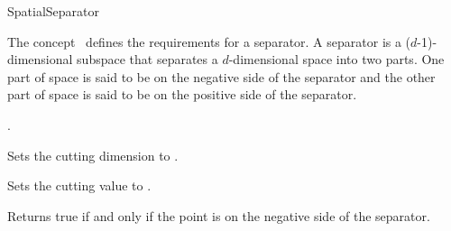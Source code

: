 

\begin{ccRefConcept}{SpatialSeparator}

\begin{ccAdvanced}


\ccDefinition
  
The concept \ccRefName\ defines the requirements for a separator.
A separator is a ($d$-1)-dimensional subspace that separates a $d$-dimensional space into two parts.
One part of space is said to be on the negative side of the separator and the other part of space is 
said to be on the positive side of the separator.

\ccHasModels

.

\ccTypes


\ccCreation
{}  %


\ccOperations

{Sets the cutting dimension to . }

{Sets the cutting value to . }





{Returns true if and only if the point  is on the negative side of the separator.}



\end{ccAdvanced}

\end{ccRefConcept}


